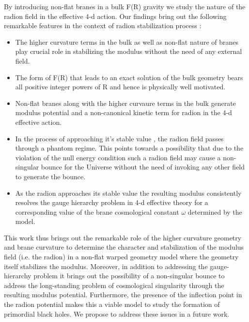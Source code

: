 \documentclass{article}
\begin{document}
By introducing non-flat branes in a bulk F(R) gravity we study the nature of the radion field in the effective 4-d action.
Our findings bring out the following remarkable features in the context  of radion stabilization process : 
\begin{itemize}
\item The higher curvature terms in the bulk as well as non-flat nature of branes play crucial role in stabilizing  the modulus without the need of any external field. 
\item The form of F(R) that leads to an exact solution of the bulk geometry bears all positive integer powers of R and hence is physically well motivated.
\item Non-flat branes along with the higher curvaure terms in the bulk generate modulus potential and a  non-canonical kinetic term for radion in the 4-d effective action.
\item In the process of approaching it's stable value , the radion field  passes through  a phantom regime. This points towards a possibility that due to the violation of the  null energy condition  such a radion field  may cause  a non-singular bounce for the Universe without the need of invoking any other field to generate the bounce.
\item As the radion approaches its stable value the resulting modulus consistently resolves the gauge hierarchy problem in 4-d effective theory for a corresponding  value of the brane cosmological constant 
$\omega$ determined by the model.
\end{itemize}
This work thus brings out the remarkable role of the higher curvature geometry and brane curvature to determine the character and stabilization of the  modulus field (i.e. the radion) in a non-flat warped geometry model where the geometry itself stabilizes the modulus. Moreover, in addition to addressing the gauge-hierarchy problem it brings out the possibility of a non-singular bounce to address the long-standing problem of cosmological singularity through the resulting modulus potential. Furthermore, the presence of the inflection point in the radion potential makes this a viable model to study the formation of primordial black holes. We propose to address these issues in a future work.
\end{document}
